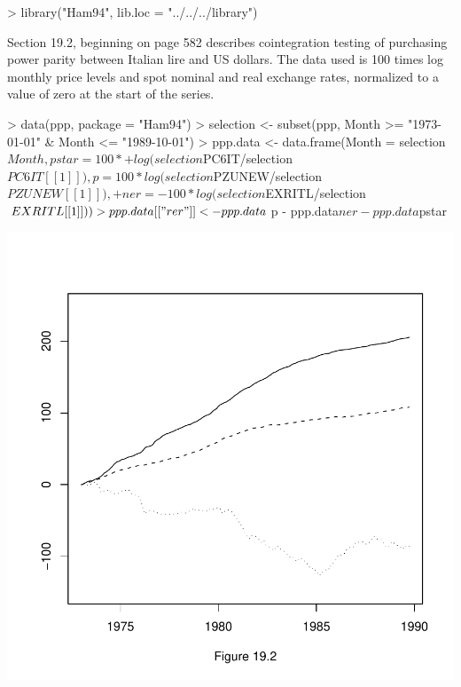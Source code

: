 \begin{Schunk}
\begin{Sinput}
> library("Ham94", lib.loc = "../../../library")
\end{Sinput}
\end{Schunk}
Section 19.2, beginning on page 582 describes cointegration testing of purchasing power parity between
Italian lire and US dollars.  The data used is 100 times log monthly price levels and spot nominal and real
exchange rates, normalized to a value of zero at the start of the series.  
\begin{Schunk}
\begin{Sinput}
> data(ppp, package = "Ham94")
> selection <- subset(ppp, Month >= "1973-01-01" & Month <= "1989-10-01")
> ppp.data <- data.frame(Month = selection$Month, pstar = 100 * 
+     log(selection$PC6IT/selection$PC6IT[[1]]), p = 100 * log(selection$PZUNEW/selection$PZUNEW[[1]]), 
+     ner = -100 * log(selection$EXRITL/selection$EXRITL[[1]]))
> ppp.data[["rer"]] <- ppp.data$p - ppp.data$ner - ppp.data$pstar
\end{Sinput}
\end{Schunk}
\begin{center}
\includegraphics{p582-003}
\end{center}
